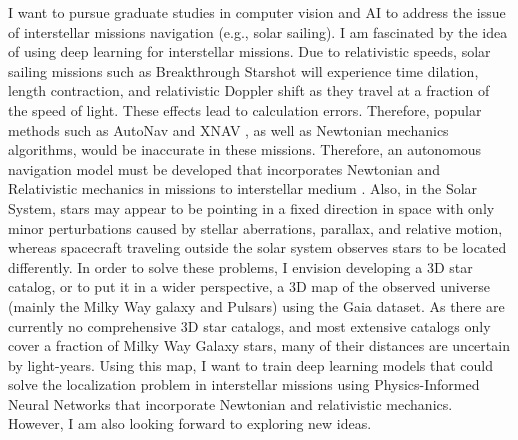 \documentclass[a4,25pt]{article}
\begin{document}
\begin{large}
\vspace{-0.25cm}\quad 
I want to pursue graduate studies in computer vision and AI to address the issue of interstellar missions navigation (e.g., solar sailing). I am fascinated by the idea of using deep learning for interstellar missions. 
Due to relativistic speeds, solar sailing missions such as Breakthrough Starshot will experience time dilation, length contraction, and relativistic Doppler shift as they travel at a fraction of the speed of light. These effects lead to calculation errors. Therefore, popular methods such as AutoNav \cite{team2000autonomous} and XNAV \cite{graven2008xnav}, as well as Newtonian mechanics algorithms, would be inaccurate in these missions. Therefore, an autonomous navigation model must be developed that incorporates Newtonian and Relativistic mechanics in missions to interstellar medium \cite{yucalan2021autonomous,yucalan2021optimal,yucalan2022autonomous}. Also, in the Solar System, stars may appear to be pointing in a fixed direction in space with only minor perturbations caused by stellar aberrations, parallax, and relative motion, whereas spacecraft traveling outside the solar system observes stars to be located differently. In order to solve these problems, I envision developing a 3D star catalog, or to put it in a wider perspective, a 3D map of the observed universe (mainly the Milky Way galaxy and Pulsars) using the Gaia dataset. As there are currently no comprehensive 3D star catalogs, and most extensive catalogs only cover a fraction of Milky Way Galaxy stars, many of their distances are uncertain by light-years\cite{mckee2022navigation}. Using this map, I want to train deep learning models that could solve the localization problem in interstellar missions using Physics-Informed Neural Networks that incorporate Newtonian and relativistic mechanics. However, I am also looking forward to exploring new ideas. \par

\end{large}
\end{document}
